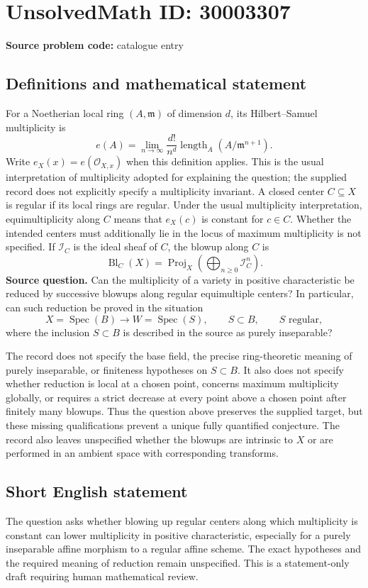\documentclass[11pt]{article}
\begin{document}
\section*{UnsolvedMath ID: 30003307}
\textbf{Source problem code:} catalogue entry
\subsection{Definitions and mathematical statement}
For a Noetherian local ring $(A,\mathfrak m)$ of dimension $d$, its Hilbert--Samuel multiplicity is
\[
e(A)=\lim_{n\to\infty}\frac{d!}{n^d}\operatorname{length}_A(A/\mathfrak m^{n+1}).
\]
Write $e_X(x)=e(\mathcal O_{X,x})$ when this definition applies. This is the usual interpretation of multiplicity adopted for explaining the question; the supplied record does not explicitly specify a multiplicity invariant. A closed center $C\subseteq X$ is regular if its local rings are regular. Under the usual multiplicity interpretation, equimultiplicity along $C$ means that $e_X(c)$ is constant for $c\in C$. Whether the intended centers must additionally lie in the locus of maximum multiplicity is not specified. If $\mathcal I_C$ is the ideal sheaf of $C$, the blowup along $C$ is
\[
\operatorname{Bl}_C(X)=\operatorname{Proj}_X\!\left(\bigoplus_{n\geq0}\mathcal I_C^n\right).
\]
\textbf{Source question.} Can the multiplicity of a variety in positive characteristic be reduced by successive blowups along regular equimultiple centers? In particular, can such reduction be proved in the situation
\[
X=\operatorname{Spec}(B)\longrightarrow W=\operatorname{Spec}(S),
\qquad S\subset B,\qquad S\text{ regular},
\]
where the inclusion $S\subset B$ is described in the source as purely inseparable?

The record does not specify the base field, the precise ring-theoretic meaning of purely inseparable, or finiteness hypotheses on $S\subset B$. It also does not specify whether reduction is local at a chosen point, concerns maximum multiplicity globally, or requires a strict decrease at every point above a chosen point after finitely many blowups. Thus the question above preserves the supplied target, but these missing qualifications prevent a unique fully quantified conjecture. The record also leaves unspecified whether the blowups are intrinsic to $X$ or are performed in an ambient space with corresponding transforms.
\subsection{Short English statement}
The question asks whether blowing up regular centers along which multiplicity is constant can lower multiplicity in positive characteristic, especially for a purely inseparable affine morphism to a regular affine scheme. The exact hypotheses and the required meaning of reduction remain unspecified. This is a statement-only draft requiring human mathematical review.
\end{document}
